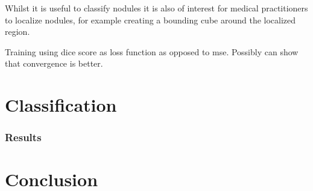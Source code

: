 \documentclass{article}%
\begin{document}
Whilst it is useful to classify nodules it is also of interest for medical practitioners to localize nodules, for example creating a bounding cube around the localized region.

Training using dice score as loss function as opposed to mse. Possibly can show that convergence is better.

\section{Classification}

\subsubsection{Results}

\section{Conclusion}



\end{document}
